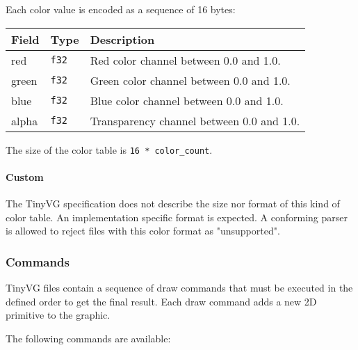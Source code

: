 \documentclass[]{article}
\begin{document}
Each color value is encoded as a sequence of 16 bytes:

\begin{longtable}[]{@{}p{1in}p{2in}p{3in}@{}}
\toprule
Field & Type & Description \\
\midrule
\endhead
red & \texttt{f32} & Red color channel between 0.0 and 1.0. \\
green & \texttt{f32} & Green color channel between 0.0 and 1.0. \\
blue & \texttt{f32} & Blue color channel between 0.0 and 1.0. \\
alpha & \texttt{f32} & Transparency channel between 0.0 and 1.0. \\
\bottomrule
\end{longtable}

The size of the color table is \texttt{16\ *\ color\_count}.

\hypertarget{custom}{%
\paragraph{Custom}\label{custom}}

The TinyVG specification does not describe the size nor format of this
kind of color table. An implementation specific format is expected. A
conforming parser is allowed to reject files with this color format as
"unsupported".

\hypertarget{commands}{%
\subsubsection{Commands}\label{commands}}

TinyVG files contain a sequence of draw commands that must be executed
in the defined order to get the final result. Each draw command adds a
new 2D primitive to the graphic.

The following commands are available:
\end{document}
